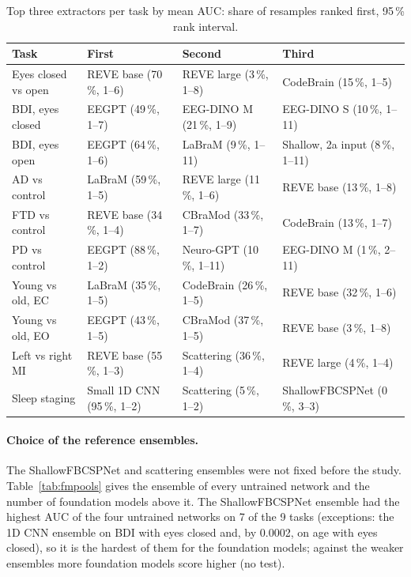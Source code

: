 \documentclass[11pt]{article}
\begin{document}
\begin{table}[h]
\centering\footnotesize\setlength{\tabcolsep}{3pt}
\caption{Top three extractors per task by mean AUC: share of resamples ranked first, 95\,\% rank
interval.}
\label{tab:ranks}
\begin{tabular}{@{}llll@{}}
\toprule
Task & First & Second & Third \\
\midrule
Eyes closed vs open & REVE base (70\,\%, 1--6) & REVE large (3\,\%, 1--8) & CodeBrain (15\,\%, 1--5) \\
BDI, eyes closed & EEGPT (49\,\%, 1--7) & EEG-DINO M (21\,\%, 1--9) & EEG-DINO S (10\,\%, 1--11) \\
BDI, eyes open & EEGPT (64\,\%, 1--6) & LaBraM (9\,\%, 1--11) & Shallow, 2a input (8\,\%, 1--11) \\
AD vs control & LaBraM (59\,\%, 1--5) & REVE large (11\,\%, 1--6) & REVE base (13\,\%, 1--8) \\
FTD vs control & REVE base (34\,\%, 1--4) & CBraMod (33\,\%, 1--7) & CodeBrain (13\,\%, 1--7) \\
PD vs control & EEGPT (88\,\%, 1--2) & Neuro-GPT (10\,\%, 1--11) & EEG-DINO M (1\,\%, 2--11) \\
Young vs old, EC & LaBraM (35\,\%, 1--5) & CodeBrain (26\,\%, 1--5) & REVE base (32\,\%, 1--6) \\
Young vs old, EO & EEGPT (43\,\%, 1--5) & CBraMod (37\,\%, 1--5) & REVE base (3\,\%, 1--8) \\
Left vs right MI & REVE base (55\,\%, 1--3) & Scattering (36\,\%, 1--4) & REVE large (4\,\%, 1--4) \\
Sleep staging & Small 1D CNN (95\,\%, 1--2) & Scattering (5\,\%, 1--2) & ShallowFBCSPNet (0\,\%, 3--3) \\
\bottomrule
\end{tabular}
\end{table}

\paragraph{Choice of the reference ensembles.} The ShallowFBCSPNet and scattering ensembles were
not fixed before the study. Table~\ref{tab:fmpools} gives the ensemble of every untrained network
and the number of foundation models above it. The ShallowFBCSPNet ensemble had the highest AUC of
the four untrained networks on 7 of the 9 tasks (exceptions: the 1D CNN ensemble on BDI with eyes closed and, by 0.0002,
on age with eyes closed), so it is the hardest of them for the foundation
models; against the weaker ensembles more foundation models score higher (no test).
\end{document}
